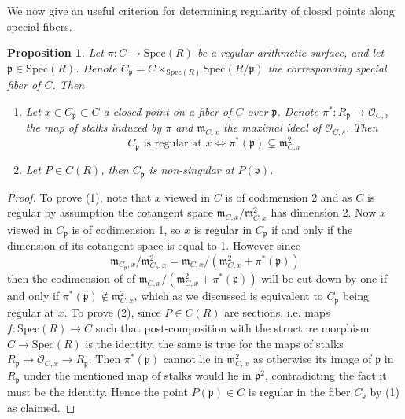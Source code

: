 \documentclass{article}
\theoremstyle{definition}
\theoremstyle{remark}
\theoremstyle{plain}
\newtheorem{proposition}[theorem]{Proposition}
\newcommand{\mc}[1]{\mathcal{#1}}
\newcommand{\mk}[1]{\mathfrak{#1}}
\begin{document}
We now give an useful criterion for determining regularity of closed points along special fibers.
\begin{proposition}
	Let $\pi: C \to \text{Spec}(R)$ be a regular arithmetic surface, and let $\mk{p} \in \text{Spec}(R)$.
	Denote $C_{\mk{p}} = C \times_{\text{Spec}(R)} \text{Spec}(R/\mk{p})$ the corresponding special fiber of $C$.
	Then
\begin{enumerate}
	\item Let $x \in C_{\mk{p}} \subset C$ a closed point on a fiber of $C$ over $\mk{p}$.
		Denote $\pi^*: R_{\mk{p}} \to \mc{O}_{C,x}$ the map of stalks induced by $\pi$ and $\mk{m}_{C,x}$ the maximal ideal of $\mc{O}_{C,s}$.
		Then 
		\[\text{$C_{\mk{p}}$ is regular at $x$} \Longleftrightarrow \pi^*(\mk{p}) \subsetneq \mk{m}^2_{C,x}\]
	\item Let $P \in C(R)$, then $C_{\mk{p}}$ is non-singular at $P(\mk{p})$. 
\end{enumerate}

\end{proposition}


\begin{proof}
	To prove (1), note that $x$ viewed in $C$ is of codimension 2 and as $C$ is regular by assumption the cotangent space $\mk{m}_{C,x}/\mk{m}^2_{C,x}$ has dimension 2.
	Now $x$ viewed in $C_{\mk{p}}$ is of codimension 1, so $x$ is regular in $C_{\mk{p}}$ if and only if the dimension of its cotangent space is equal to 1.
	However since
	\[\mk{m}_{C_{\mk{p}},x}/\mk{m}^2_{C_{\mk{p}},x} = \mk{m}_{C,x}/(\mk{m}^2_{C,x} + \pi^*(\mk{p}))\]
	then the codimension of of $ \mk{m}_{C,x}/(\mk{m}^2_{C,x} + \pi^*(\mk{p}))$ will be cut down by one if and only if $\pi^*(\mk{p}) \notin \mk{m}^2_{C,x}$, which as we discussed is equivalent to $C_{\mk{p}}$ being regular at $x$.\newline
	\indent To prove (2), since $P \in C(R)$ are sections, i.e. maps $f: \text{Spec}(R) \to C$ such that post-composition with the structure morphism $C \to \text{Spec}(R)$ is the identity, the same is true for the maps of stalks $R_{\mk{p}} \to \mc{O}_{C,x} \to R_{\mk{p}}$.
	Then $\pi^*(\mk{p})$ cannot lie in $\mk{m}^2_{C,x}$ as otherwise its image of $\mk{p}$ in $R_{\mk{p}}$ under the mentioned map of stalks would lie in $\mk{p}^2$, contradicting the fact it must be the identity.
	Hence the point $P(\mk{p}) \in C$ is regular in the fiber $C_{\mk{p}}$ by (1) as claimed.
\end{proof}
\end{document}
